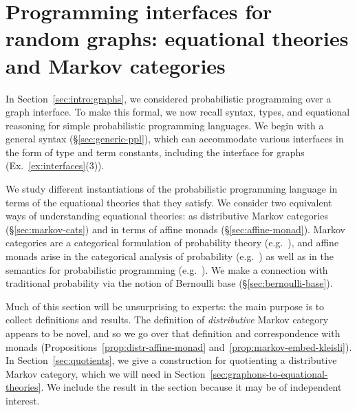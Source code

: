 \section{Programming interfaces for random graphs: equational theories
and Markov categories}
In Section~\ref{sec:intro:graphs}, 
we considered probabilistic
programming over a graph interface. To make this formal, we now recall
syntax, types, and equational reasoning for simple probabilistic
programming languages.
We begin with a general syntax (\S\ref{sec:generic-ppl}), which can
accommodate various interfaces in the form of type and term
constants, including the interface for graphs (Ex.~\ref{ex:interfaces}(3)). 

We study different instantiations of the probabilistic programming
language in terms of the equational theories that they satisfy. We
consider two equivalent ways of understanding equational theories: as
distributive Markov categories (\S\ref{sec:markov-cats}) and in terms
of affine monads (\S\ref{sec:affine-monad}). Markov categories are a
  categorical formulation of probability theory (e.g.~\cite{fritz}), and affine
  monads arise in the categorical analysis of probability (e.g.~\cite{fgpt-weakly-affine,jacobs-commutative-effectus,kock:commutative-monads-as-a-theory-of-distributions})
  as well as in the semantics for probabilistic programming
  (e.g.~\cite{lazyppl,dsp-layer,amorim-markov}). 
We make a connection with traditional probability via the notion of
Bernoulli base (\S\ref{sec:bernoulli-base}).

Much of this section will be unsurprising to experts: the main purpose is to collect
definitions and results. The definition of \emph{distributive} Markov
category appears to be novel, and so we go over that definition and
correspondence with monads (Propositions~\ref{prop:distr-affine-monad} and~\ref{prop:markov-embed-kleisli}).
In Section~\ref{sec:quotients}, we give a construction for quotienting a distributive Markov category, which we will need in Section~\ref{sec:graphons-to-equational-theories}.
We include the result in the section because it may be of independent interest.
  

